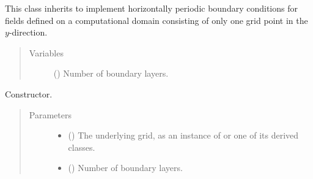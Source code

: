 \documentclass[letterpaper,10pt,english]{sphinxmanual}
\begin{document}
\begin{fulllineitems}
\label{\detokenize{api:dycore.horizontal_boundary.PeriodicXZ}}
This class inherits {\hyperref[\detokenize{api:dycore.horizontal_boundary.HorizontalBoundary}]{}} to implement horizontally periodic boundary conditions for fields defined
on a computational domain consisting of only one grid point in the \(y\)-direction.
\begin{quote}\begin{description}
\item[{Variables}] \leavevmode
{\hyperref[\detokenize{api:dycore.prognostic_isentropic.PrognosticIsentropic.nb}]{}} () \textendash{} Number of boundary layers.

\end{description}\end{quote}

\begin{fulllineitems}
\label{\detokenize{api:dycore.horizontal_boundary.PeriodicXZ.__init__}}
Constructor.
\begin{quote}\begin{description}
\item[{Parameters}] \leavevmode\begin{itemize}
\item {} 
 () \textendash{} The underlying grid, as an instance of {\hyperref[\detokenize{api:grids.grid_xyz.GridXYZ}]{}} or one of its derived classes.

\item {} 
 () \textendash{} Number of boundary layers.

\end{itemize}

\end{description}\end{quote}

\end{fulllineitems}



\end{fulllineitems}
\end{document}
